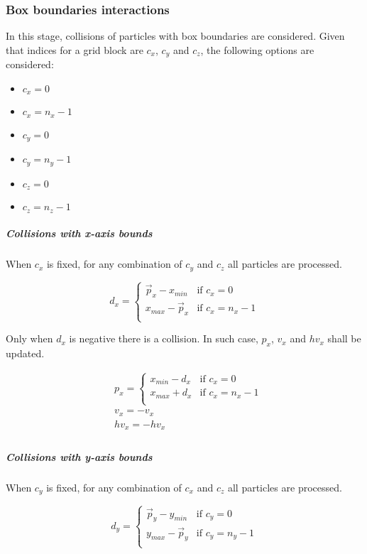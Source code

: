 \subsubsection{Box boundaries interactions}

In this stage, collisions of particles with box boundaries are considered.
Given that indices for a grid block are $c_x$, $c_y$ and $c_z$, the following
options are considered:

\begin{itemize}
\item $c_x=0$
\item $c_x=n_x-1$
\item $c_y=0$
\item $c_y=n_y-1$
\item $c_z=0$
\item $c_z=n_z-1$
\end{itemize}

\subparagraph{Collisions with x-axis bounds}

When $c_x$ is fixed, for any combination of $c_y$ and $c_z$ all particles are
processed. 

\[
d_x =
\begin{cases}
  \vec{p}_x -x_{min}  & \text{if } c_x = 0\\
  x_{max} - \vec{p}_x & \text{if } c_x = n_x - 1\\
\end{cases}
\]

Only when $d_x$ is negative there is a collision. In such case, $p_x$, $v_x$ 
and $hv_x$ shall be updated.

\[
\begin{split}
&p_x = 
  \begin{cases}
    x_{min} - d_x & \text{if } c_x = 0\\
    x_{max} + d_x & \text{if } c_x = n_x -1\\
  \end{cases}\\
&v_x = -v_x\\
&hv_x = -hv_x\\
\end{split}
\]

\subparagraph{Collisions with y-axis bounds}

When $c_y$ is fixed, for any combination of $c_x$ and $c_z$ all particles are
processed. 

\[
d_y =
\begin{cases}
  \vec{p}_y - y_{min}  & \text{if } c_y = 0\\
  y_{max} - \vec{p}_y & \text{if } c_y = n_y - 1\\
\end{cases}
\]

